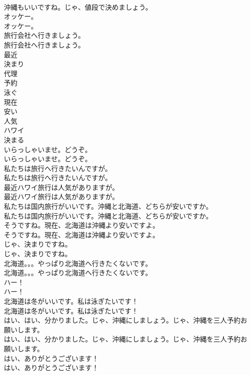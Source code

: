 \documentclass[8pt]{extreport}
\begin{document}
\begin{CJK}{UTF8}{min}
\\	沖縄もいいですね。じゃ、値段で決めましょう。 
\\	オッケー。	
\\	オッケー。 
\\	旅行会社へ行きましょう。	
\\	旅行会社へ行きましょう。 
\\	最近
\\	決まり
\\	代理
\\	予約
\\	泳ぐ
\\	現在
\\	安い
\\	人気
\\	ハワイ
\\	決まる
\\	いらっしゃいませ。どうぞ。	
\\	いらっしゃいませ。どうぞ。 
\\	私たちは旅行へ行きたいんですが。	
\\	私たちは旅行へ行きたいんですが。 
\\	最近ハワイ旅行は人気がありますが。	
\\	最近ハワイ旅行は人気がありますが。 
\\	私たちは国内旅行がいいです。沖縄と北海道、どちらが安いですか。	
\\	私たちは国内旅行がいいです。沖縄と北海道、どちらが安いですか。 
\\	そうですね。現在、北海道は沖縄より安いですよ。	
\\	そうですね。現在、北海道は沖縄より安いですよ。 
\\	じゃ、決まりですね。	
\\	じゃ、決まりですね。 
\\	北海道。。。やっぱり北海道へ行きたくないです。	
\\	北海道。。。やっぱり北海道へ行きたくないです。 
\\	ハー！	
\\	ハー！ 
\\	北海道は冬がいいです。私は泳ぎたいです！	
\\	北海道は冬がいいです。私は泳ぎたいです！ 
\\	はい、はい、分かりました。じゃ、沖縄にしましょう。じゃ、沖縄を三人予約お願いします。	
\\	はい、はい、分かりました。じゃ、沖縄にしましょう。じゃ、沖縄を三人予約お願いします。 
\\	はい、ありがとうございます！	
\\	はい、ありがとうございます！ 

\end{CJK}
\end{document}
